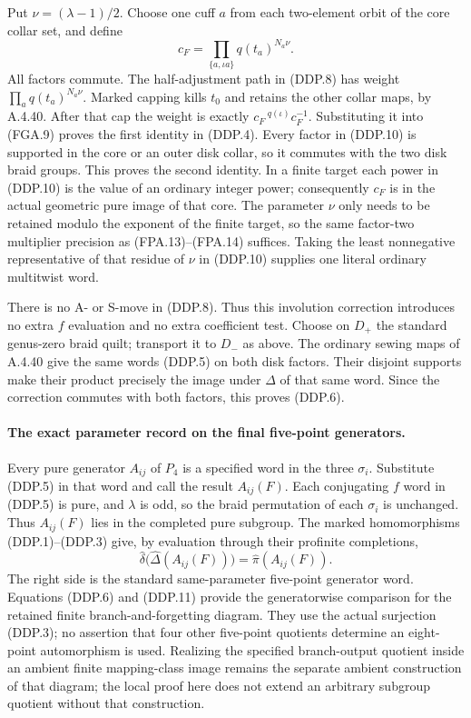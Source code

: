 Put $\nu=(\lambda-1)/2$.  Choose one cuff $a$ from each two-element
orbit of the core collar set, and define
\[
                     c_F=\prod_{\{a,\iota a\}}q(t_a)^{N_a\nu}.
                                                               \tag{DDP.10}
\]
All factors commute.  The half-adjustment path in (DDP.8) has weight
$\prod_aq(t_a)^{N_a\nu}$.  Marked capping kills $t_0$ and retains
the other collar maps, by A.4.40.  After that cap the weight is
exactly $c_F\,{}^{q(\iota)}c_F^{-1}$.  Substituting it into
(FGA.9) proves the first identity in (DDP.4).  Every factor in
(DDP.10) is supported in the core or an outer disk collar, so it
commutes with the two disk braid groups.  This proves the second
identity.  In a finite target each power in (DDP.10) is the value
of an ordinary integer power; consequently $c_F$ is in the actual
geometric pure image of that core.  The parameter $\nu$ only needs
to be retained modulo the exponent of the finite target, so the
same factor-two multiplier precision as (FPA.13)--(FPA.14) suffices.
Taking the least nonnegative representative of that residue of
$\nu$ in (DDP.10) supplies one literal ordinary multitwist word.

There is no A- or S-move in (DDP.8).  Thus this involution correction
introduces no extra $f$ evaluation and no extra coefficient test.
Choose on $D_+$ the standard genus-zero braid quilt; transport it
to $D_-$ as above.  The ordinary sewing maps of A.4.40 give the
same words (DDP.5) on both disk factors.  Their disjoint supports
make their product precisely the image under $\Delta$ of that
same word.  Since the correction commutes with both factors, this
proves (DDP.6).

\paragraph{The exact parameter record on the final five-point generators.}
Every pure generator $A_{ij}$ of $P_4$ is a specified word in the
three $\sigma_i$.  Substitute (DDP.5) in that word and call the
result $A_{ij}(F)$.  Each conjugating $f$ word in (DDP.5) is pure,
and $\lambda$ is odd, so the braid permutation of each $\sigma_i$
is unchanged.  Thus $A_{ij}(F)$ lies in the completed pure subgroup.
The marked homomorphisms (DDP.1)--(DDP.3)
give, by evaluation through their profinite completions,
\[
 \widehat\delta\bigl(\widehat\Delta(A_{ij}(F))\bigr)
                         =\widehat\pi(A_{ij}(F)).                \tag{DDP.11}
\]
The right side is the standard same-parameter five-point generator
word.  Equations (DDP.6) and (DDP.11) provide the generatorwise
comparison for the retained finite branch-and-forgetting diagram.
They use the actual surjection (DDP.3); no assertion that four
other five-point quotients determine an eight-point automorphism
is used.  Realizing the specified branch-output quotient inside an
ambient finite mapping-class image remains the separate ambient
construction of that diagram; the local proof here does not extend
an arbitrary subgroup quotient without that construction.

